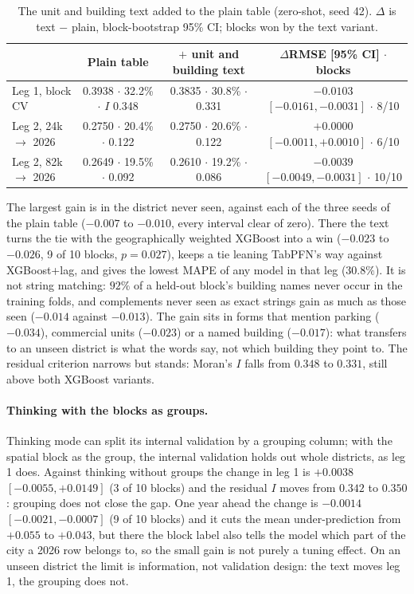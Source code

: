 \documentclass[11pt,a4paper]{article}
\begin{document}
\begin{table}[h]
\centering\small
\caption{The unit and building text added to the plain table (zero-shot, seed 42). $\Delta$ is
text $-$ plain, block-bootstrap 95\% CI; blocks won by the text variant.}
\label{tab:text}
\scriptsize\setlength{\tabcolsep}{3.5pt}
\begin{tabular}{lccc}
\toprule
 & Plain table & $+$ unit and building text & $\Delta$RMSE [95\% CI] $\cdot$ blocks \\
\midrule
Leg 1, block CV & 0.3938 $\cdot$ 32.2\% $\cdot$ $I$ 0.348 & 0.3835 $\cdot$ 30.8\% $\cdot$ 0.331 & $-0.0103$ $[-0.0161, -0.0031]$ $\cdot$ 8/10 \\
Leg 2, 24k $\to$ 2026 & 0.2750 $\cdot$ 20.4\% $\cdot$ 0.122 & 0.2750 $\cdot$ 20.6\% $\cdot$ 0.122 & $+0.0000$ $[-0.0011, +0.0010]$ $\cdot$ 6/10 \\
Leg 2, 82k $\to$ 2026 & 0.2649 $\cdot$ 19.5\% $\cdot$ 0.092 & 0.2610 $\cdot$ 19.2\% $\cdot$ 0.086 & $-0.0039$ $[-0.0049, -0.0031]$ $\cdot$ 10/10 \\
\bottomrule
\end{tabular}
\end{table}

The largest gain is in the district never seen, against each of the three seeds of the plain
table ($-0.007$ to $-0.010$, every interval clear of zero). There the text turns the tie with
the geographically weighted XGBoost into a win ($-0.023$ to $-0.026$, 9 of 10 blocks,
$p = 0.027$), keeps a tie leaning TabPFN's way against XGBoost+lag, and gives the lowest MAPE of
any model in that leg ($30.8\%$). It is not string matching: $92\%$ of a held-out block's
building names never occur in the training folds, and complements never seen as exact strings
gain as much as those seen ($-0.014$ against $-0.013$). The gain sits in forms that mention
parking ($-0.034$), commercial units ($-0.023$) or a named building ($-0.017$): what transfers
to an unseen district is what the words say, not which building they point to. The residual
criterion narrows but stands: Moran's $I$ falls from $0.348$ to $0.331$, still above both
XGBoost variants.

\paragraph{Thinking with the blocks as groups.} Thinking mode can split its internal validation
by a grouping column; with the spatial block as the group, the internal validation holds out
whole districts, as leg 1 does. Against thinking without groups the change in leg 1 is $+0.0038$
$[-0.0055, +0.0149]$ (3 of 10 blocks) and the residual $I$ moves from $0.342$ to $0.350$:
grouping does not close the gap. One year ahead the change is $-0.0014$
$[-0.0021, -0.0007]$ (9 of 10 blocks) and it cuts the mean under-prediction from $+0.055$ to
$+0.043$, but there the block label also
tells the model which part of the city a 2026 row belongs to, so the small gain is not purely a
tuning effect. On an unseen district the limit is information, not validation design: the text
moves leg 1, the grouping does not.
\end{document}
